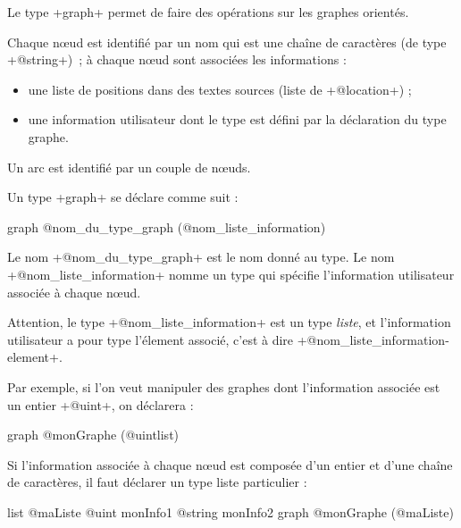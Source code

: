 



Le type \ggst+graph+ permet de faire des opérations sur les graphes orientés.

Chaque nœud est identifié par un nom qui est une chaîne de caractères (de type \ggst+@string+)~; à chaque nœud sont associées les informations :
\begin{itemize}
  \item une liste de positions dans des textes sources (liste de \ggst+@location+) ;
  \item une information utilisateur dont le type est défini par la déclaration du type graphe.
\end{itemize}

Un arc est identifié par un couple de nœuds.


Un type \ggst+graph+ se déclare comme suit :
\begin{galgas3}
graph @nom_du_type_graph (@nom_liste_information) {
}
\end{galgas3}

Le nom \ggst+@nom_du_type_graph+ est le nom donné au type. Le nom \ggst+@nom_liste_information+ nomme un type qui spécifie l'information utilisateur associée à chaque nœud.

Attention, le type \ggst+@nom_liste_information+ est un type \emph{liste}, et l'information utilisateur a pour type l'élement associé, c'est à dire \ggst+@nom_liste_information-element+.

Par exemple, si l'on veut manipuler des graphes dont l'information associée est un entier \ggst+@uint+, on déclarera :
\begin{galgas3}
graph @monGraphe (@uintlist) {
}
\end{galgas3}

Si l'information associée à chaque nœud est composée d'un entier et d'une chaîne de caractères, il faut déclarer un type liste particulier :
\begin{galgas3}
list @maListe {
  @uint monInfo1
  @string monInfo2
}
graph @monGraphe (@maListe) {
}
\end{galgas3}






